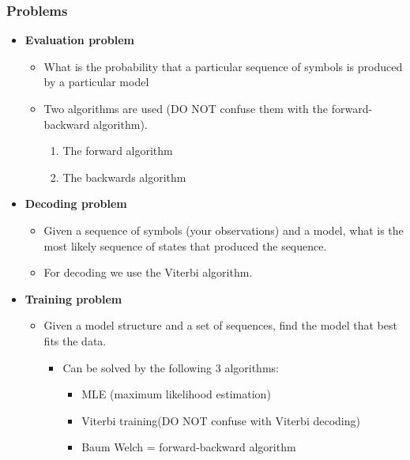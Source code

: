 \documentclass[11pt]{article}
\begin{document}
\subsubsection{Problems}
\label{sec:org8e16298}
\begin{itemize}
\item \textbf{Evaluation problem}
\begin{itemize}
\item What is the probability that a particular sequence of symbols is produced by a particular model
\item Two algorithms are used  (DO NOT confuse them with the forward-backward algorithm).
\begin{enumerate}
\item The forward algorithm
\item The backwards algorithm
\end{enumerate}
\end{itemize}

\item \textbf{Decoding problem}
\begin{itemize}
\item Given a sequence of symbols (your observations) and a model, what is the most likely sequence of states that produced the sequence.
\item For decoding we use the Viterbi algorithm.
\end{itemize}

\item \textbf{Training problem}
\begin{itemize}
\item Given a model structure and a set of sequences, find the model that best fits the data.
\begin{itemize}
\item Can be solved by the following 3 algorithms:
\begin{itemize}
\item MLE (maximum likelihood estimation)
\item Viterbi training(DO NOT confuse with Viterbi decoding)
\item Baum Welch = forward-backward algorithm
\end{itemize}
\end{itemize}
\end{itemize}
\end{itemize}
\end{document}
